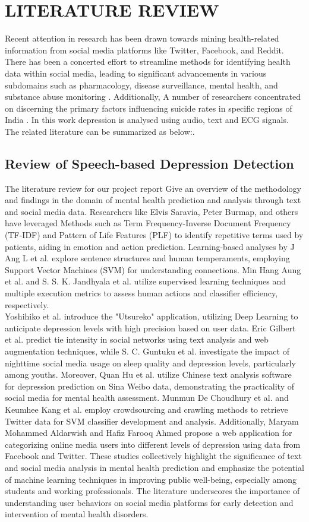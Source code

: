 \chapter{LITERATURE REVIEW}

Recent attention in research has been drawn towards mining health-related information from social media platforms like Twitter, Facebook, and Reddit. There has been a concerted effort to streamline methods for identifying health data within social media, leading to significant advancements in various subdomains such as pharmacology, disease surveillance, mental health, and substance abuse monitoring \cite{correia2020mining}. Additionally, A number of researchers concentrated on discerning the primary factors influencing suicide rates in specific regions of India \cite{mehra2022mental}. In this work depression is analysed using audio, text and ECG signals. The related literature can be summarized as below:. 
\section{Review of Speech-based Depression Detection}
The literature review for our project report Give an overview of the methodology and findings in the domain of mental health prediction and analysis through text and social media data. 
Researchers like Elvis Saravia, Peter Burmap, and others have leveraged Methods such as Term Frequency-Inverse Document Frequency (TF-IDF) and Pattern of Life Features (PLF) to identify repetitive terms used by patients, aiding in emotion and action prediction. Learning-based analyses by J Ang L et al. explore sentence structures and human temperaments, employing Support Vector Machines (SVM) for understanding connections. Min Hang Aung et al. and S. S. K. Jandhyala et al. utilize supervised learning techniques and multiple execution metrics to assess human actions and classifier efficiency, respectively.
\\
Yoshihiko et al. introduce the "Utsureko" application, utilizing Deep Learning to anticipate depression levels with high precision based on user data. Eric Gilbert et al. predict tie intensity in social networks using text analysis and web augmentation techniques, while S. C. Guntuku et al. investigate the impact of nighttime social media usage on sleep quality and depression levels, particularly among youths.
Moreover, Quan Hu et al. utilize Chinese text analysis software for depression prediction on Sina Weibo data, demonstrating the practicality of social media for mental health assessment. Munmun De Choudhury et al. and Keumhee Kang et al. employ crowdsourcing and crawling methods to retrieve Twitter data for SVM classifier development and analysis. Additionally, Maryam Mohammed Aldarwish and Hafiz Farooq Ahmed propose a web application for categorizing online media users into different levels of depression using data from Facebook and Twitter.
These studies collectively highlight the significance of text and social media analysis in mental health prediction and emphasize the potential of machine learning techniques in improving public well-being, especially among students and working professionals. The literature underscores the importance of understanding user behaviors on social media platforms for early detection and intervention of mental health disorders.
